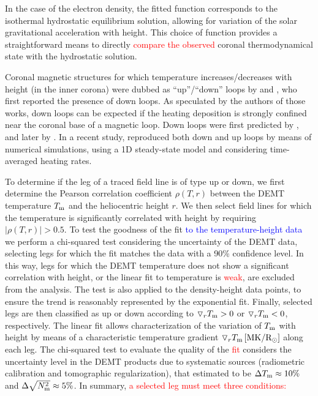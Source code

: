 \documentclass[namedreferences]{solarphysics}
\def\edit#1{\textcolor{Red}{#1}}
\def\del#1{\textcolor{Blue}{#1}}
\newcommand{\mrsun}{{\rm R_\odot}}
\newcommand{\MK}{{\rm MK}}
\newcommand{\dr}{\triangledown_r}
\newcommand{\Tm}{T_{\rm m}}
\newcommand{\Nsqm}{N^2_{{\rm m}}}
\newcommand{\rhoTr}{\rho(T,r)}
\newcommand{\sqravgN}{\sqrt{\Nsqm}}
\begin{document}
\begin{article}
In the case of the electron density, the fitted function corresponds to the isothermal hydrostatic equilibrium solution, allowing for variation of the solar gravitational acceleration with height. This choice of function provides a straightforward means to directly \edit{compare the observed} coronal thermodynamical state with the hydrostatic solution.

{Coronal magnetic structures for which temperature increases/decreases with height (in the inner corona) were dubbed as “up”/“down” loops by \citet{huang_2012} and \citet{nuevo_2013}, who first reported the presence of down loops. As speculated by the authors of those works, down loops can be expected if the heating deposition is strongly confined near the coronal base of a magnetic loop. Down loops were first predicted by \citet{serio_1981}, and later by \citet{aschwanden_2002}. In a recent study, \citet{schiff_2016} reproduced both down and up loops by means of numerical simulations, using a 1D steady-state model and {considering time-averaged heating rates.}}

{To determine if the leg of a traced field line is} of type up or down, we first determine the Pearson correlation coefficient $\rhoTr$ between the DEMT temperature $\Tm$ and the heliocentric height $r$. We then select field lines for which the temperature {is significantly correlated with height} by requiring $|\rhoTr| > 0.5$. {To test the goodness of the fit \del{to the temperature-height data} we perform a chi-squared test \citep{recipes} considering the uncertainty of the DEMT data, selecting legs for which the fit matches the data with a 90\% confidence level.} In this way, legs for which the DEMT temperature does not show a significant {correlation} with height, or the linear fit to temperature is \edit{weak}, are {excluded from the} analysis. {The test is also applied to the density-height data points, to ensure the trend is reasonably represented by the exponential fit.} Finally, selected legs are then classified as up or down according to $\dr\Tm > 0$ or $\dr\Tm < 0$, respectively. The linear fit allows characterization of the variation of $\Tm$ with height by means of a characteristic temperature gradient $\dr \Tm\,[\MK/\mrsun]$ along each leg. {The chi-squared test to evaluate the quality of the \edit{fit} considers the uncertainty level in the DEMT products due to systematic sources (radiometric calibration and tomographic regularization), that \citet{lloveras_2017} estimated to be $\Delta\Tm\approx 10\%$ and $\Delta\sqravgN\approx 5\%$.} In summary, \edit{a selected leg must meet three conditions:}


\end{article}
\end{document}
